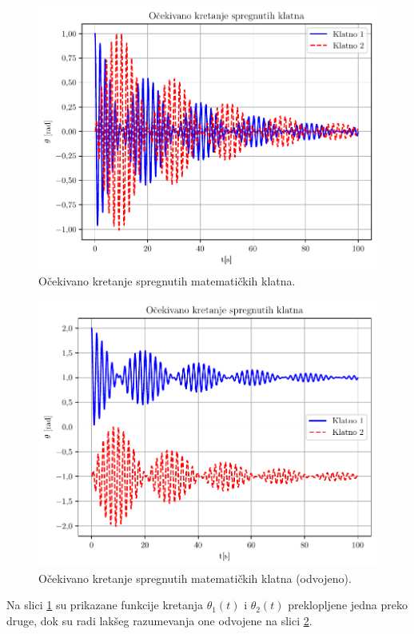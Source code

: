 \documentclass[a4paper, 12pt, diplomski]{etf}
\begin{document}
\begin{figure}[h!]
    \centering
    \includegraphics[scale=0.9]{py_teorija/spregnuto_mat.pdf}
    \caption{Očekivano kretanje spregnutih matematičkih klatna.}
    \label{sim_kretanja}
\end{figure}


\begin{figure}[h!]
    \centering
    \includegraphics[scale=0.9]{py_teorija/spregnuto_mat2.pdf}
    \caption{Očekivano kretanje spregnutih matematičkih klatna (odvojeno).}
    \label{sim_kretanja2}
\end{figure}

\noindent
Na slici \ref{sim_kretanja} su prikazane funkcije kretanja $\theta_1(t)$ i $\theta_2(t)$ preklopljene jedna preko druge, dok su radi lakšeg razumevanja one odvojene na slici \ref{sim_kretanja2}.
\end{document}
